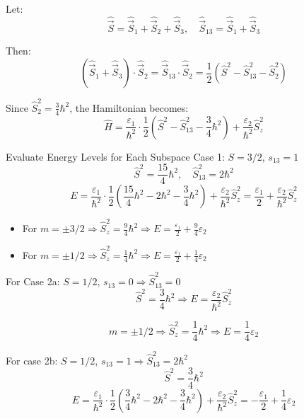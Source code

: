 \documentclass[12pt]{article}
\begin{document}
        Let:
        \[
            \hat{\vec{S}} = \hat{\vec{S}}_1 + \hat{\vec{S}}_2 + \hat{\vec{S}}_3, \quad \hat{\vec{S}}_{13} = \hat{\vec{S}}_1 + \hat{\vec{S}}_3
        \]

        Then:
        \[
            (\hat{\vec{S}}_1 + \hat{\vec{S}}_3) \cdot \hat{\vec{S}}_2 = \hat{\vec{S}}_{13} \cdot \hat{\vec{S}}_2 = \frac{1}{2} \left( \hat{S}^2 - \hat{S}_{13}^2 - \hat{S}_2^2 \right)
        \]

        Since \( \hat{S}_2^2 = \frac{3}{4} \hbar^2 \), the Hamiltonian becomes:
        \[
            \hat{H} = \frac{\varepsilon_1}{\hbar^2} \cdot \frac{1}{2} \left( \hat{S}^2 - \hat{S}_{13}^2 - \frac{3}{4} \hbar^2 \right) + \frac{\varepsilon_2}{\hbar^2} \hat{S}_z^2
        \]

        Evaluate Energy Levels for Each Subspace
        \newline Case 1: \( S = 3/2 \), \( s_{13} = 1 \)
        \[
            \hat{S}^2 = \frac{15}{4} \hbar^2, \quad \hat{S}_{13}^2 = 2 \hbar^2
        \]
        \[
            E = \frac{\varepsilon_1}{\hbar^2} \cdot \frac{1}{2} \left( \frac{15}{4} \hbar^2 - 2 \hbar^2 - \frac{3}{4} \hbar^2 \right) + \frac{\varepsilon_2}{\hbar^2} \hat{S}_z^2
            = \frac{\varepsilon_1}{2} + \frac{\varepsilon_2}{\hbar^2} \hat{S}_z^2
        \]
        \begin{itemize}
            \item For \( m = \pm 3/2 \Rightarrow \hat{S}_z^2 = \frac{9}{4} \hbar^2 \Rightarrow E = \frac{\varepsilon_1}{2} + \frac{9}{4} \varepsilon_2 \)
            \item For \( m = \pm 1/2 \Rightarrow \hat{S}_z^2 = \frac{1}{4} \hbar^2 \Rightarrow E = \frac{\varepsilon_1}{2} + \frac{1}{4} \varepsilon_2 \)
        \end{itemize}

        For Case 2a: \( S = 1/2 \), \( s_{13} = 0 \Rightarrow \hat{S}_{13}^2 = 0 \)
        \[
            \hat{S}^2 = \frac{3}{4} \hbar^2 \Rightarrow E = \frac{\varepsilon_2}{\hbar^2} \hat{S}_z^2
        \]
        
        \[
            m = \pm 1/2 \Rightarrow \hat{S}_z^2 = \frac{1}{4} \hbar^2 \Rightarrow E = \frac{1}{4} \varepsilon_2
        \]

        For case 2b: \( S = 1/2 \), \( s_{13} = 1 \Rightarrow \hat{S}_{13}^2 = 2 \hbar^2 \)
        \[
            \hat{S}^2 = \frac{3}{4} \hbar^2
        \]
        \[
            E = \frac{\varepsilon_1}{\hbar^2} \cdot \frac{1}{2} \left( \frac{3}{4} \hbar^2 - 2 \hbar^2 - \frac{3}{4} \hbar^2 \right) + \frac{\varepsilon_2}{\hbar^2} \hat{S}_z^2
            = -\frac{\varepsilon_1}{2} + \frac{1}{4} \varepsilon_2
        \]
\end{document}
